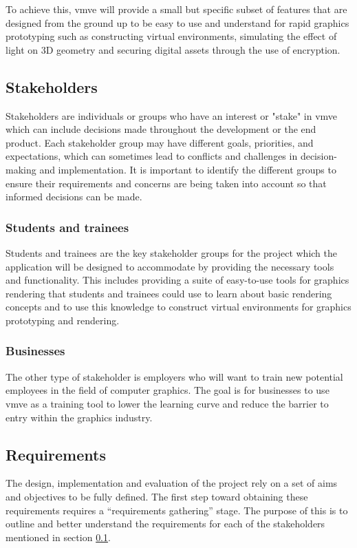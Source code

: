 \documentclass[11pt]{article}
\begin{document}
To achieve this, \gls*{vmve} will provide a small but specific subset of
features that are designed from the ground up to be easy to use and understand
for rapid graphics prototyping such as constructing virtual environments,
simulating the effect of light on 3D geometry and securing digital assets
through the use of encryption.

\subsection{Stakeholders} \label{stakeholders}
Stakeholders are individuals or groups who have an interest or "stake" in
\gls*{vmve} which can include decisions made throughout the development or the
end product. Each stakeholder group may have different goals, priorities, and
expectations, which can sometimes lead to conflicts and challenges in
decision-making and implementation. It is important to identify the different
groups to ensure their requirements and concerns are being taken into account so
that informed decisions can be made.

\subsubsection{Students and trainees}
Students and trainees are the key stakeholder groups for the project which the
application will be designed to accommodate by providing the necessary tools and
functionality. This includes providing a suite of easy-to-use tools for graphics
rendering that students and trainees could use to learn about basic rendering
concepts and to use this knowledge to construct virtual environments for
graphics prototyping and rendering.

\subsubsection{Businesses}
The other type of stakeholder is employers who will want to train new potential
employees in the field of computer graphics. The goal is for businesses to use
\gls*{vmve} as a training tool to lower the learning curve and reduce the
barrier to entry within the graphics industry.

\subsection{Requirements}
The design, implementation and evaluation of the project rely on a set of aims
and objectives to be fully defined. The first step toward obtaining these
requirements requires a ``requirements gathering'' stage. The purpose of this
is to outline and better understand the requirements for each of the
stakeholders mentioned in section \ref{stakeholders}.
\end{document}
